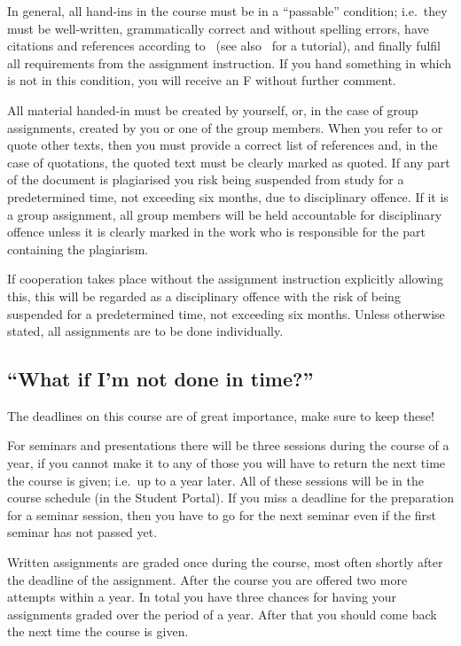 In general, all hand-ins in the course must be in a \enquote{passable} 
condition; i.e.~they must be well-written, grammatically correct and without 
spelling errors, have citations and references according to~\cite{IEEEcitation} 
(see also~\cite{PurdueCitation} for a tutorial), and finally fulfil all 
requirements from the assignment instruction.
If you hand something in which is not in this condition, you will receive an 
F without further comment.

All material handed-in must be created by yourself, or, in the case of group 
assignments, created by you or one of the group members.
When you refer to or quote other texts, then you must provide a correct list of 
references and, in the case of quotations, the quoted text must be clearly 
marked as quoted.
If any part of the document is plagiarised you risk being suspended from study 
for a predetermined time, not exceeding six months, due to disciplinary 
offence.
If it is a group assignment, all group members will be held accountable for 
disciplinary offence unless it is clearly marked in the work who is responsible 
for the part containing the plagiarism.

If cooperation takes place without the assignment instruction explicitly 
allowing this, this will be regarded as a disciplinary offence with the risk of
being suspended for a predetermined time, not exceeding six months.
Unless otherwise stated, all assignments are to be done individually.

\subsection{\enquote{What if I'm not done in time?}}
\label{sec:late}
The deadlines on this course are of great importance, make sure to keep these!

For seminars and presentations there will be three sessions during the course 
of a year, if you cannot make it to any of those you will have to return the 
next time the course is given; i.e.~up to a year later.
All of these sessions will be in the course schedule (in the Student Portal).
If you miss a deadline for the preparation for a seminar session, then you have 
to go for the next seminar even if the first seminar has not passed yet.

Written assignments are graded once during the course, most often shortly after 
the deadline of the assignment.
After the course you are offered two more attempts within a year.
In total you have three chances for having your assignments graded over the 
period of a year.
After that you should come back the next time the course is given.

